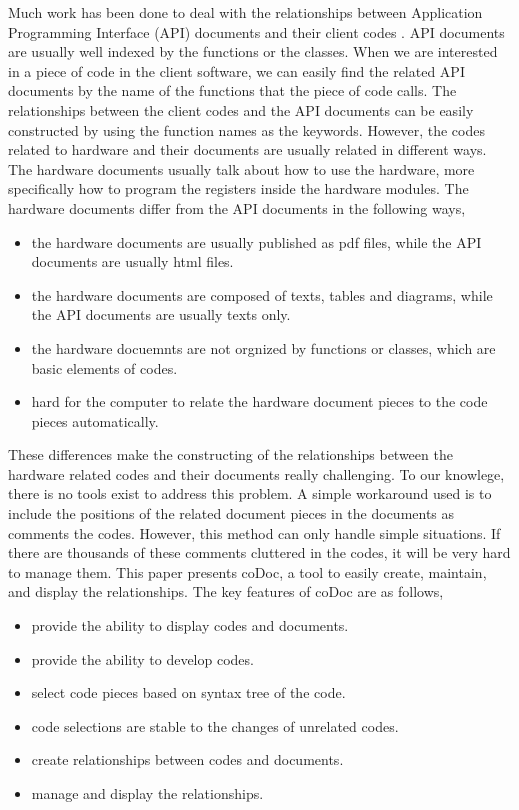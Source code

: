 \documentclass[11pt,letterpaper,oneside]{article}
\begin{document}
Much work has been done to deal with the relationships between Application Programming Interface (API) documents and their client codes \cite{Pandita_inferring_2012}.
API documents are usually well indexed by the functions or the classes.
When we are interested in a piece of code in the client software,
we can easily find the related API documents by the name of the functions that the piece of code calls.
The relationships between the client codes and the API documents can be easily constructed by using the function names as the keywords.
However, the codes related to hardware and their documents are usually related in different ways.
The hardware documents usually talk about how to use the hardware,
more specifically how to program the registers inside the hardware modules.
The hardware documents differ from the API documents in the following ways,
\begin{itemize}
\item the hardware documents are usually published as pdf files, while the API documents are usually html files.
\item the hardware documents are composed of texts, tables and diagrams, while the API documents are usually texts only.
\item the hardware docuemnts are not orgnized by functions or classes, which are basic elements of codes.
\item hard for the computer to relate the hardware document pieces to the code pieces automatically.
\end{itemize}

These differences make the constructing of the relationships between the hardware related codes and their documents really challenging.
To our knowlege, there is no tools exist to address this problem.
A simple workaround used is to include the positions of the related document pieces in the documents as comments the codes.
However, this method can only handle simple situations.
If there are thousands of these comments cluttered in the codes,
it will be very hard to manage them.
This paper presents coDoc, a tool to easily create, maintain, and display the relationships.
The key features of coDoc are as follows,
\begin{itemize}
\item provide the ability to display codes and documents.
\item provide the ability to develop codes.
\item select code pieces based on syntax tree of the code.
\item code selections are stable to the changes of unrelated codes.
\item create relationships between codes and documents.
\item manage and display the relationships.
\end{itemize}
\end{document}
